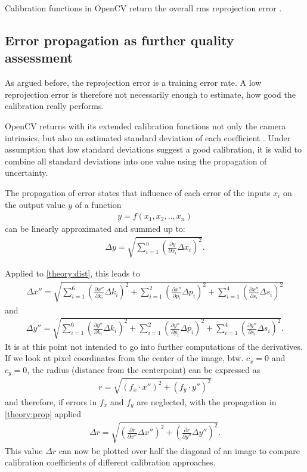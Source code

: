 Calibration functions in OpenCV return the overall \acs{rms} reprojection error \cite{cv_calib}.

\subsection{Error propagation as further quality assessment}
As argued before, the reprojection error is a training error rate.
A low reprojection error is therefore not necessarily enough to estimate, how good the calibration really performs.

OpenCV returns with its extended calibration functions not only the camera intrinsics, but also an estimated standard deviation of each coefficient \cite{cv_calib}.
Under assumption that low standard deviations suggest a good calibration, it is valid to combine all standard deviations into one value using the propagation of uncertainty.

The propagation of error states that influence of each error of the inputs $x_i$ on the output value $y$ of a function
\begin{align*}
	y = f(x_1, x_2,..,x_n)
\end{align*}
can be linearly approximated and summed up to:
\begin{align}
	\Delta y = \sqrt{\sum_{i=1}^{n}\left(\frac{\partial y}{\partial x_i}\Delta x_i \right)^2} \label{theory:prop}.
\end{align}

Applied to \ref{theory:dist}, this leads to
\begin{align*}
	\Delta x''=\sqrt{\sum_{i=1}^{6}\left(\frac{\partial x''}{\partial k_i}\Delta k_i \right)^2+\sum_{i=1}^{2}\left( \frac{\partial x''}{\partial p_i}\Delta p_i\right)^2+\sum_{i=1}^{4}\left( \frac{\partial x''}{\partial s_i}\Delta s_i\right)^2}
\end{align*}
and
\begin{align*}
	\Delta y''=\sqrt{\sum_{i=1}^{6}\left(\frac{\partial y''}{\partial k_i}\Delta k_i \right)^2+\sum_{i=1}^{2}\left( \frac{\partial y''}{\partial p_i}\Delta p_i\right)^2+\sum_{i=1}^{4}\left( \frac{\partial y''}{\partial s_i}\Delta s_i\right)^2}.
\end{align*}
It is at this point not intended to go into further computations of the derivatives.
If we look at pixel coordinates from the center of the image, btw. $c_x=0$ and $c_y=0$, the radius (distance from the centerpoint) can be expressed as
\begin{align*}
	r = \sqrt{(f_x\cdot x'')^2+(f_y\cdot y'')^2}
\end{align*}
and therefore, if errors in $f_x$ and $f_y$ are neglected, with the propagation in \ref{theory:prop} applied
\begin{align}
	\Delta r = \sqrt{\left(\frac{\partial r}{\partial x''} \Delta x''\right)^2+\left(\frac{\partial r}{\partial y''} \Delta y''\right)^2}\label{theory:delta_r}.
\end{align}
This value $\Delta r$ can now be plotted over half the diagonal of an image to compare calibration coefficients of different calibration approaches.
